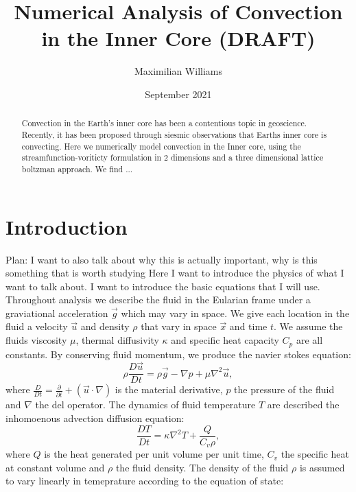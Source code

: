 \documentclass{article}
\title{Numerical Analysis of Convection in the Inner Core (DRAFT)}
\author{Maximilian Williams}
\date{September 2021}
\begin{document}
\maketitle

\begin{abstract}
	Convection in the Earth's inner core has been a contentious topic in geoscience. Recently, it has been proposed through siesmic observations that Earths inner core is convecting. Here we numerically model convection in the Inner core, using the streamfunction-voriticty formulation in 2 dimensions and a three dimensional lattice boltzman approach. We find ...
	
 
\end{abstract}


\section*{Introduction}
Plan:
I want to also talk about why this is actually important, why is this something that is worth studying
\newline
Here I want to introduce the physics of what I want to talk about. I want to introduce 
the basic equations that I will use.
\newline
\noindent Throughout analysis we describe the fluid in the Eularian frame under a graviational acceleration $\vec{g}$ which may vary in space. We give each location in the fluid a velocity $\vec{u}$ and density $\rho$ that vary in space $\vec{x}$ and time $t$. We assume the fluids viscosity $\mu$, thermal diffusivity $\kappa$ and specific heat capacity $C_p$ are all constants. By conserving fluid momentum, we produce the navier stokes equation:
\begin{equation}
	\rho \frac{D \vec{u}}{D t} = \rho \vec{g} - \nabla p + \mu \nabla^2 \vec{u},
	\label{NSE}
\end{equation}
where $\frac{D}{D t} = \frac{\partial }{\partial t} + (\vec{u} \cdot \nabla)$ is the material derivative, $p$ the pressure of the fluid and $\nabla$ the del operator. The dynamics of fluid temperature $T$ are described the inhomoenous advection diffusion equation:
\begin{equation}
	\frac{D T}{D t} = \kappa \nabla^2 T + \frac{Q}{C_v \rho},
	\label{adeT}
\end{equation}
where $Q$ is the heat generated per unit volume per unit time, $C_v$ the specific heat at constant volume and $\rho$ the fluid density. The density of the fluid $\rho$ is assumed to vary linearly in temeprature according to the equation of state:
\end{document}
